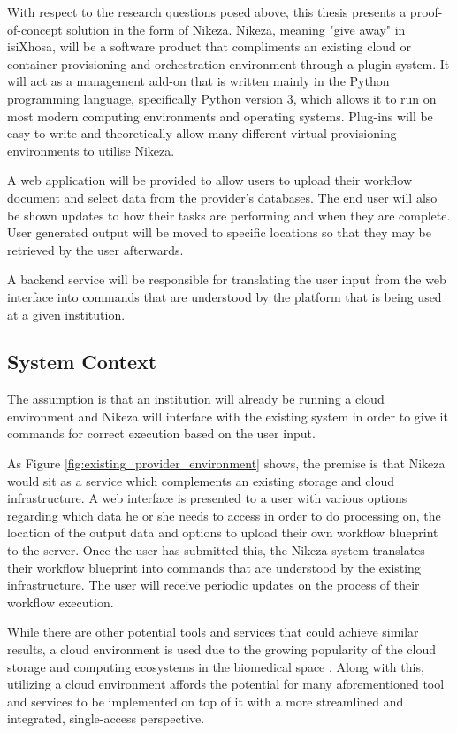 With respect to the research questions posed above, this thesis presents a proof-of-concept solution in the form of Nikeza. Nikeza, meaning "give away" in isiXhosa, will be a software product that compliments an existing cloud or container provisioning and orchestration environment through a plugin system. It will act as a management add-on that is written mainly in the Python programming language, specifically Python version 3, which allows it to run on most modern computing environments and operating systems. Plug-ins will be easy to write and theoretically allow many different virtual provisioning environments to utilise Nikeza.

A web application will be provided to allow users to upload their workflow document and select data from the provider's databases. The end user will also be shown updates to how their tasks are performing and when they are complete. User generated output will be moved to specific locations so that they may be retrieved by the user afterwards.

A backend service will be responsible for translating the user input from the web interface into commands that are understood by the platform that is being used at a given institution.

\subsection{System Context}

The assumption is that an institution will already be running a cloud environment and Nikeza will interface with the existing system in order to give it commands for correct execution based on the user input.

As Figure \ref{fig:existing_provider_environment} shows, the premise is that Nikeza would sit as a service which complements an existing storage and cloud infrastructure. A web interface is presented to a user with various options regarding which data he or she needs to access in order to do processing on, the location of the output data and options to upload their own workflow blueprint to the server. Once the user has submitted this, the Nikeza system translates their workflow blueprint into commands that are understood by the existing infrastructure. The user will receive periodic updates on the process of their workflow execution.

While there are other potential tools and services that could achieve similar results, a cloud environment is used due to the growing popularity of the cloud storage and computing ecosystems in the biomedical space \parencite{navale2018cloud,connor2016climb,afgan2015genomics,liu2014cloud}. Along with this, utilizing a cloud environment affords the potential for many aforementioned tool and services to be implemented on top of it with a more streamlined and integrated, single-access perspective.


